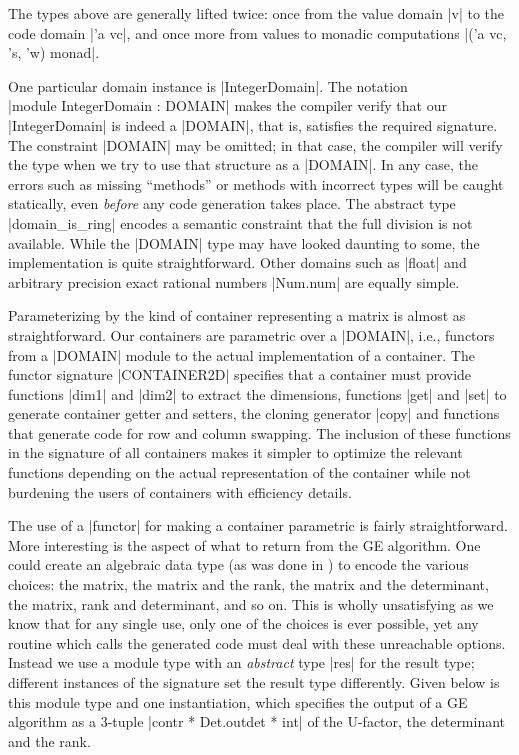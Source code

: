 \documentclass[draft]{elsart}
\begin{document}
\noindent  The types above are
generally lifted twice: once from the value domain |v| to the code
domain |'a vc|, and once more from values to monadic computations
|('a vc, 's, 'w) monad|. 

One particular domain instance is |IntegerDomain|. The notation\\
|module IntegerDomain : DOMAIN| makes the compiler verify that our
|IntegerDomain| is indeed a |DOMAIN|, that is, satisfies the required
signature. The constraint |DOMAIN| may be omitted; in that case, the
compiler will verify the type when we try to use that structure as a
|DOMAIN|. In any case, the errors such as missing ``methods'' or
methods with incorrect types will be caught statically, even
\emph{before} any code generation takes place. The abstract type
|domain_is_ring| encodes a semantic constraint that the full division
is not available. While the |DOMAIN| type may have looked daunting to
some, the implementation is quite straightforward.  Other domains such
as |float| and arbitrary precision exact rational numbers |Num.num|
are equally simple.

Parameterizing by the kind of container representing a matrix is
almost as straightforward.  Our containers are  parametric
over a |DOMAIN|, i.e., functors from a |DOMAIN| module
to the actual implementation of a container. The functor signature
|CONTAINER2D| specifies that a container must provide functions |dim1|
and |dim2| to extract the dimensions, functions |get| and |set| to
generate container getter and setters, the cloning generator |copy|
and functions that generate code for row and column swapping. The
inclusion of these functions in the signature of all containers makes
it simpler to optimize the relevant functions depending on the actual
representation of the container while not burdening the users of
containers with efficiency details. 

The use of a |functor| for making a container parametric is fairly
straightforward.  More interesting is the aspect of what to return
from the GE algorithm.  One could create an algebraic data type (as
was done in \cite{carette04}) to encode the various choices: the
matrix, the matrix and the rank, the matrix and the determinant, the
matrix, rank and determinant, and so on. This is wholly unsatisfying
as we know that for any single use, only one of the choices is ever
possible, yet any routine which calls the generated code must deal
with these unreachable options.  Instead we use a module type with an
\emph{abstract} type |res| for the result type; different instances of
the signature set the result type differently. Given below is this
module type and one instantiation, which specifies the output of a GE
algorithm as a 3-tuple |contr * Det.outdet * int| of the U-factor, the
determinant and the rank.
\end{document}
